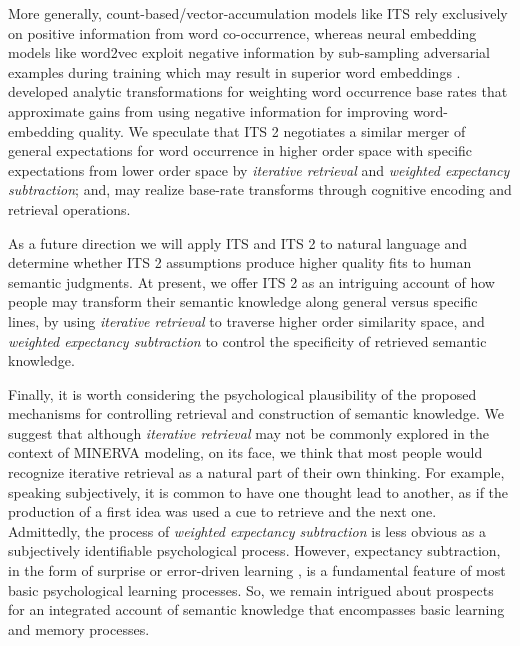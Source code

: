\documentclass[10pt,letterpaper]{article}
\begin{document}
More generally, count-based/vector-accumulation models like ITS rely exclusively on positive information from word co-occurrence, whereas neural embedding models like word2vec \cite{mikolovDistributedRepresentationsWords2013} exploit negative information by sub-sampling adversarial examples during training which may result in superior word embeddings \cite{manderaExplainingHumanPerformance2017a}. \citeauthor{johnsRoleNegativeInformation2019} \citeyear{johnsRoleNegativeInformation2019} developed analytic transformations for weighting word occurrence base rates that approximate gains from using negative information for improving word-embedding quality. We speculate that ITS 2 negotiates a similar merger of general expectations for word occurrence in higher order space with specific expectations from lower order space by \emph{iterative retrieval} and \emph{weighted expectancy subtraction}; and, may realize base-rate transforms through cognitive encoding and retrieval operations.

As a future direction we will apply ITS and ITS 2 to natural language and determine whether ITS 2 assumptions produce higher quality fits to human semantic judgments. At present, we offer ITS 2 as an intriguing account of how people may transform their semantic knowledge along general versus specific lines, by using 
\emph{iterative retrieval} to traverse higher order similarity space, and \emph{weighted expectancy subtraction} to control the specificity of retrieved semantic knowledge.

Finally, it is worth considering the psychological plausibility of the proposed mechanisms for controlling retrieval and construction of semantic knowledge. We suggest that although \emph{iterative retrieval} may not be commonly explored in the context of MINERVA modeling, on its face, we think that most people would recognize iterative retrieval as a natural part of their own thinking. For example, speaking subjectively, it is common to have one thought lead to another, as if the production of a first idea was used a cue to retrieve and the next one. Admittedly, the process of  \emph{weighted expectancy subtraction} is less obvious as a subjectively identifiable psychological process. However, expectancy subtraction, in the form of surprise or error-driven learning \cite{rescorlaTheoryPavlovianConditioning1972}, is a fundamental feature of most basic psychological learning processes. So, we remain intrigued about prospects for an integrated account of semantic knowledge that encompasses basic learning and memory processes.
\end{document}
